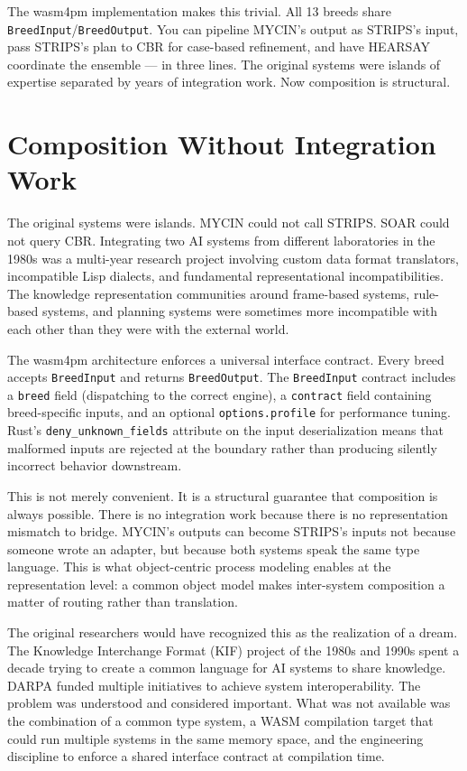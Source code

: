 The wasm4pm implementation makes this trivial. All 13 breeds share
\texttt{BreedInput}/\texttt{BreedOutput}. You can pipeline MYCIN's output as STRIPS's input,
pass STRIPS's plan to CBR for case-based refinement, and have HEARSAY coordinate the ensemble
--- in three lines. The original systems were islands of expertise separated by years of
integration work. Now composition is structural.

\section{Composition Without Integration Work}
\label{sec:composition}

The original systems were islands. MYCIN could not call STRIPS. SOAR could not query CBR.
Integrating two AI systems from different laboratories in the 1980s was a multi-year research
project involving custom data format translators, incompatible Lisp dialects, and fundamental
representational incompatibilities. The knowledge representation communities around frame-based
systems, rule-based systems, and planning systems were sometimes more incompatible with each
other than they were with the external world.

The wasm4pm architecture enforces a universal interface contract. Every breed accepts
\texttt{BreedInput} and returns \texttt{BreedOutput}. The \texttt{BreedInput} contract includes
a \texttt{breed} field (dispatching to the correct engine), a \texttt{contract} field containing
breed-specific inputs, and an optional \texttt{options.profile} for performance tuning. Rust's
\texttt{deny\_unknown\_fields} attribute on the input deserialization means that malformed inputs
are rejected at the boundary rather than producing silently incorrect behavior downstream.

This is not merely convenient. It is a structural guarantee that composition is always possible.
There is no integration work because there is no representation mismatch to bridge. MYCIN's
outputs can become STRIPS's inputs not because someone wrote an adapter, but because both
systems speak the same type language. This is what object-centric process modeling enables at
the representation level: a common object model makes inter-system composition a matter of
routing rather than translation.

The original researchers would have recognized this as the realization of a dream. The
Knowledge Interchange Format (KIF) project of the 1980s and 1990s spent a decade trying to
create a common language for AI systems to share knowledge. DARPA funded multiple initiatives
to achieve system interoperability. The problem was understood and considered important. What
was not available was the combination of a common type system, a WASM compilation target that
could run multiple systems in the same memory space, and the engineering discipline to enforce
a shared interface contract at compilation time.

